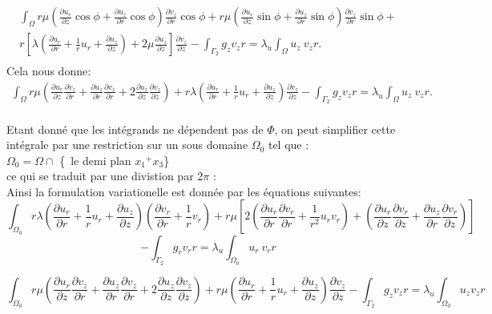 \documentclass[a4paper,11pt]{article}   %
\begin{document}
\begin{eqnarray*} 
 \int_{\Omega} r \mu \left(\frac{\partial u_r}{\partial z}\cos\phi + \frac{\partial u_z}{\partial r}\cos\phi\right)\frac{\partial v_z}{\partial r}\cos\phi + r \mu \left(\frac{\partial u_r}{\partial z}\sin\phi + \frac{\partial u_z}{\partial r}\sin\phi\right)\frac{\partial v_z}{\partial r}\sin\phi  + \\
 r \left[\lambda (\frac{\partial u_r}{\partial r} + \frac{1}{r} u_r + \frac{\partial u_z}{\partial z} ) + 2 \mu \frac{\partial u_z}{\partial z}\right] \frac{\partial v_z}{\partial z} - \int_{\Gamma_2} g_z v_z  r =\lambda _u \int_{\Omega}u_z\ v_z r. \\
\end{eqnarray*}
 Cela nous donne: \\
\begin{eqnarray*}
 \int_{\Omega} r \mu \left(\frac{\partial u_r}{\partial z}\frac{\partial v_z}{\partial r} + \frac{\partial u_z}{\partial r}\frac{\partial v_z}{\partial r} + 2 \frac{\partial u_z}{\partial z} \frac{\partial v_z}{\partial z}\right) +  r \lambda \left(\frac{\partial u_r}{\partial r} + \frac{1}{r} u_r + \frac{\partial u_z}{\partial z} \right)\frac{\partial v_z}{\partial z} - \int_{\Gamma_2} g_z v_z  r =\lambda _u \int_{\Omega}u_z\ v_z r.
\end{eqnarray*} \\

Etant donné que les intégrands ne dépendent pas de $\Phi$, on peut simplifier cette intégrale par une restriction sur un sous domaine  $\Omega_0$ tel que : \\
$\Omega_0 = \Omega \cap $ \{\ le demi plan ${x_1}^{+} x_3$\}\ \\
ce qui se traduit par une divistion par 2$\pi$ : \\
Ainsi la formulation variationelle est donnée par les équations suivantes: \\

$$ \int_{\Omega_0} r \lambda (\frac{\partial u_r}{\partial r} + \frac{1}{r} u_r + \frac{\partial u_z}{\partial z}) (\frac{\partial v_r}{\partial r} + \frac{1}{r} v_r) + r \mu \left[ 2 \left(\frac{\partial u_r}{\partial r}\frac{\partial v_r}{\partial r} + \frac{1}{r^2} u_r v_r\right) +  \left(\frac{\partial u_r}{\partial z}\frac{\partial v_r}{\partial z} + \frac{\partial u_z}{\partial r}\frac{\partial v_r}{\partial z}\right)\right] $$
$$- \int_{\Gamma_2} g_r v_r r =\lambda _u \int_{\Omega_0}u_r\ v_r r $$




$$\int_{\Omega_0} r \mu (\frac{\partial u_{r}}{\partial z}\frac{\partial v_{z}}{\partial r} + \frac{\partial u_{z}}{\partial r}\frac{\partial v_{z}}{\partial r} + 2 
\frac{\partial u_{z}}{\partial z}\frac{\partial v_{z}}{\partial z}) +
r\mu(\frac{\partial u_{r}}{\partial r}+ \frac{1}{r} u_{r} + \frac{\partial u_{z}}{\partial z}) \frac{\partial v_{z}}{\partial z}
-\int_{\Gamma_{2}} g_{z}v_{z}r  
=\lambda _u \int_{\Omega_0} u_{z}v_{z}r$$
\end{document}
